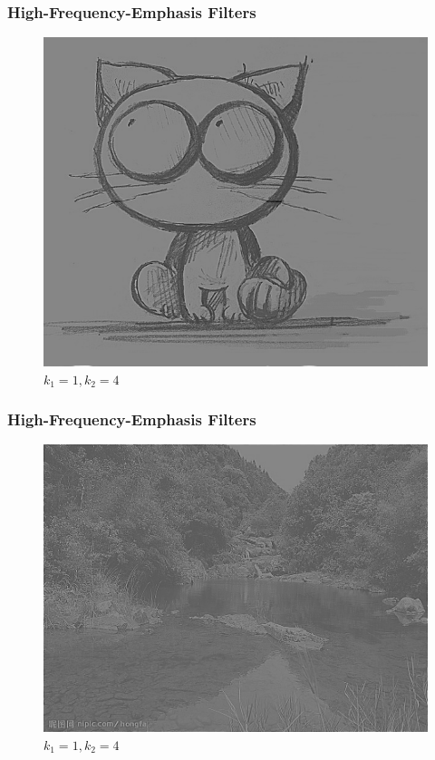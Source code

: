 \documentclass[notheorems, serif, table, compress]{beamer}  %
\begin{document}
\begin{frame}
\frametitle{High-Frequency-Emphasis Filters}
\begin{figure}
 \centering
 \caption{$k_{1}=1,k_{2}=4$}
 \includegraphics[width=0.8\linewidth]{k4hfef1.png} 
 \end{figure}
 \end{frame}

\begin{frame}
\frametitle{High-Frequency-Emphasis Filters}
\begin{figure}
 \centering
 \caption{$k_{1}=1,k_{2}=4$}
 \includegraphics[width=0.8\linewidth]{k4hfef2.png} 
 \end{figure}
 \end{frame}
\end{document}
